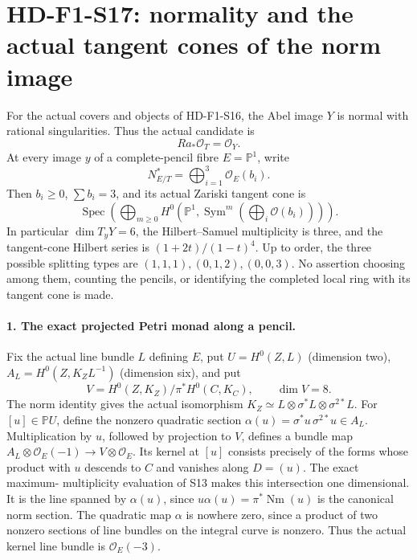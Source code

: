 
\section{HD-F1-S17: normality and the actual tangent cones of the norm image}
\label{sec:f1-norm-fourfold-normality}

For the actual covers and objects of HD-F1-S16, the Abel image $Y$ is
normal with rational singularities. Thus the actual candidate is
\[
                        Ra_*\mathcal O_T=\mathcal O_Y.
 \tag{F1S17.1}
\]
At every image $y$ of a complete-pencil fibre $E=\mathbb P^1$, write
\[
                  N^*_{E/T}=\bigoplus_{i=1}^3\mathcal O_E(b_i).
\]
Then $b_i\geq0$, $\sum b_i=3$, and its actual Zariski tangent cone is
\[
 \operatorname{Spec}\left(
       \bigoplus_{m\geq0}H^0\left(\mathbb P^1,
                \operatorname{Sym}^m\!\left(\bigoplus_i\mathcal O(b_i)\right)
                                     \right)\right).
 \tag{F1S17.2}
\]
In particular $\dim T_yY=6$, the Hilbert--Samuel multiplicity is three,
and the tangent-cone Hilbert series is $(1+2t)/(1-t)^4$. Up to order,
the three possible splitting types are $(1,1,1),(0,1,2),(0,0,3)$.
No assertion choosing among them, counting the pencils, or identifying
the completed local ring with its tangent cone is made.

\paragraph{1. The exact projected Petri monad along a pencil.}
Fix the actual line bundle $L$ defining $E$, put
$U=H^0(Z,L)$ (dimension two), $A_L=H^0(Z,K_ZL^{-1})$ (dimension six),
and put
\[
             V=H^0(Z,K_Z)/\pi^*H^0(C,K_C),\qquad\dim V=8.
\]
The norm identity gives the actual isomorphism
$K_Z\simeq L\otimes\sigma^*L\otimes\sigma^{2*}L$.
For $[u]\in\mathbb P U$, define the nonzero quadratic section
$\alpha(u)=\sigma^*u\,\sigma^{2*}u\in A_L$.
Multiplication by $u$, followed by projection to $V$, defines a bundle
map $A_L\otimes\mathcal O_E(-1)\to V\otimes\mathcal O_E$.
Its kernel at $[u]$ consists precisely of the forms whose product with
$u$ descends to $C$ and vanishes along $D=(u)$. The exact maximum-
multiplicity evaluation of S13 makes this intersection one dimensional.
It is the line spanned by $\alpha(u)$, since
$u\alpha(u)=\pi^*\operatorname{Nm}(u)$ is the canonical norm section.
The quadratic map $\alpha$ is nowhere zero, since a product of two
nonzero sections of line bundles on the integral curve is nonzero.
Thus the actual kernel line bundle is $\mathcal O_E(-3)$.

